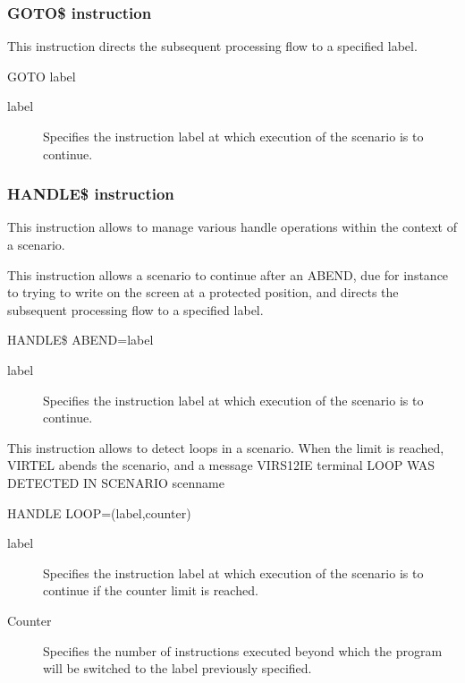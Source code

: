 \documentclass[letterpaper,10pt,english]{sphinxmanual}
\begin{document}
\subsubsection{GOTO\$ instruction}
\label{\detokenize{User_Guide:goto-instruction}}
This instruction directs the subsequent processing flow to a specified label.

\begin{sphinxVerbatim}[commandchars=\\\{\}]
GOTO\PYGZdl{} label
\end{sphinxVerbatim}
\begin{description}
\item[{label}] \leavevmode
Specifies the instruction label at which execution of the scenario is to continue.

\end{description}


\subsubsection{HANDLE\$ instruction}
\label{\detokenize{User_Guide:handle-instruction}}
This instruction allows to manage various handle operations within the context of a scenario.


This instruction allows a scenario to continue after an ABEND, due for instance to trying to write on the screen at a
protected position, and directs the subsequent processing flow to a specified label.

HANDLE\$ ABEND=label
\begin{description}
\item[{label}] \leavevmode
Specifies the instruction label at which execution of the scenario is to continue.

\end{description}


This instruction allows to detect loops in a scenario. When the limit is reached, VIRTEL abends the scenario, and a
message VIRS12IE terminal LOOP WAS DETECTED IN SCENARIO scenname

\begin{sphinxVerbatim}[commandchars=\\\{\}]
HANDLE\PYGZdl{} LOOP=(label,counter)
\end{sphinxVerbatim}
\begin{description}
\item[{label}] \leavevmode
Specifies the instruction label at which execution of the scenario is to continue if the counter limit is reached.

\item[{Counter}] \leavevmode
Specifies the number of instructions executed beyond which the program will be switched to the label previously specified.

\end{description}
\end{document}
